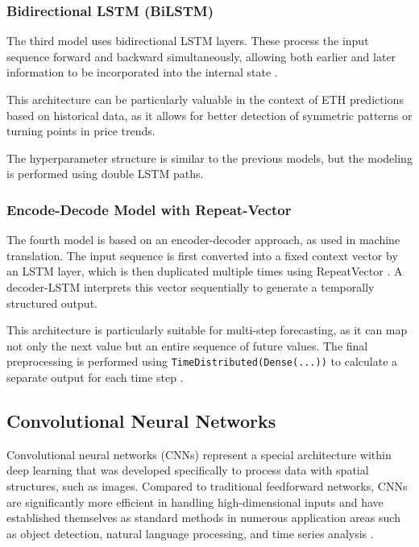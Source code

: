 \subsubsection{Bidirectional LSTM (BiLSTM)}

The third model uses bidirectional LSTM layers.
These process the input sequence forward and backward simultaneously, allowing both earlier and later information to be incorporated into the internal state \cite{bi-lstm}.

This architecture can be particularly valuable in the context of ETH predictions based on historical data, as it allows for better detection of symmetric patterns or turning points in price trends.

The hyperparameter structure is similar to the previous models, but the modeling is performed using double LSTM paths.



\subsubsection{Encode-Decode Model with Repeat-Vector}

The fourth model is based on an encoder-decoder approach, as used in machine translation.
The input sequence is first converted into a fixed context vector by an LSTM layer, which is then duplicated multiple times using RepeatVector \cite{keras-repeat-vector}.
A decoder-LSTM interprets this vector sequentially to generate a temporally structured output.

This architecture is particularly suitable for multi-step forecasting, as it can map not only the next value but an entire sequence of future values.
The final preprocessing is performed using \verb|TimeDistributed(Dense(...))| to calculate a separate output for each time step \cite{keras-time-distributed}.



\subsection{Convolutional Neural Networks}

Convolutional neural networks (CNNs) represent a special architecture within deep learning that was developed specifically to process data with spatial structures, such as images.
Compared to traditional feedforward networks, CNNs are significantly more efficient in handling high-dimensional inputs and have established themselves as standard methods in numerous application areas such as object detection, natural language processing, and time series analysis \cite{cnn-for-time-series}.


